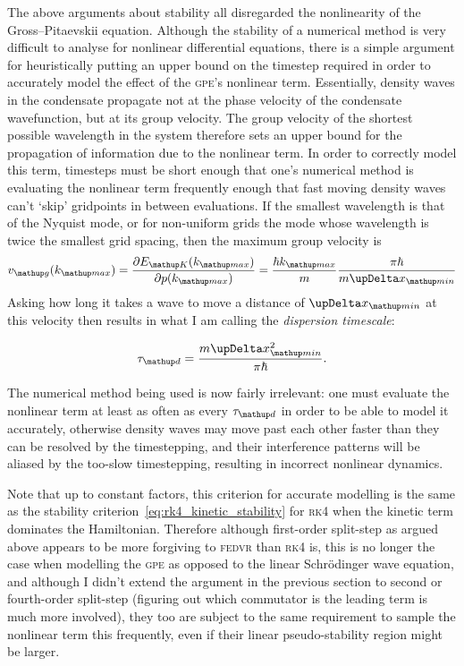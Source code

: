 The above arguments about stability all disregarded the nonlinearity of the Gross--Pitaevskii equation. Although the stability of a numerical method is very difficult to analyse for nonlinear differential equations, there is a simple argument for heuristically putting an upper bound on the timestep required in order to accurately model the effect of the \textsc{gpe}'s nonlinear term. Essentially, density waves in the condensate propagate not at the phase velocity of the condensate wavefunction, but at its group velocity. The group velocity of the shortest possible wavelength in the system therefore sets an upper bound for the propagation of information due to the nonlinear term. In order to correctly model this term, timesteps must be short enough that one's numerical method is evaluating the nonlinear term frequently enough that fast moving density waves can't `skip' gridpoints in between evaluations. If the smallest wavelength is that of the Nyquist mode, or for non-uniform grids the mode whose wavelength is twice the smallest grid spacing, then the maximum group velocity is
\begin{equation}
v_\up{g}(k_\up{max}) = \pdv{E_\up{K}(k_\up{max})}{p(k_\up{max})} =  \frac{\hbar k_\up{max}}{m}\frac{\pi \hbar}{m \upDelta x_\up{min}}
\end{equation}
Asking how long it takes a wave to move a distance of $\upDelta x_\up{min}$ at this velocity then results in what I am calling the \emph{dispersion timescale}:

\begin{equation}
\tau_\up d = \frac{m\upDelta x_\up{min}^2 }{\pi \hbar}.
\end{equation} 

The numerical method being used is now fairly irrelevant: one must evaluate the nonlinear term at least as often as every $\tau_\up d$ in order to be able to model it accurately, otherwise density waves may move past each other faster than they can be resolved by the timestepping, and their interference patterns will be aliased by the too-slow timestepping, resulting in incorrect nonlinear dynamics.

Note that up to constant factors, this criterion for accurate modelling is the same as the stability criterion~\eqref{eq:rk4_kinetic_stability} for \textsc{rk4} when the kinetic term dominates the Hamiltonian. Therefore although first-order split-step as argued above appears to be more forgiving to \textsc{fedvr} than \textsc{rk4} is, this is no longer the case when modelling the \textsc{gpe} as opposed to the linear Schr\"odinger wave equation, and although I didn't extend the argument in the previous section to second or fourth-order split-step (figuring out which commutator is the leading term is much more involved), they too are subject to the same requirement to sample the nonlinear term this frequently, even if their linear pseudo-stability region might be larger.

